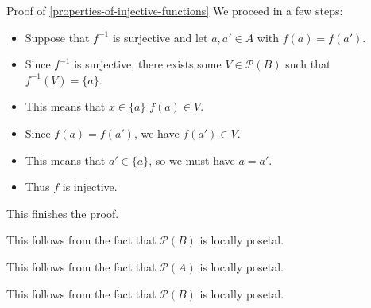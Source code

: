 \begin{Proof}{Proof of \cref{properties-of-injective-functions}}
    We proceed in a few steps:
    \begin{itemize}
        \item Suppose that $f^{-1}$ is surjective and let $a,a'\in A$ with $f(a)=f(a')$.
        \item Since $f^{-1}$ is surjective, there exists some $V\in\mathcal{P}(B)$ such that $f^{-1}(V)=\{a\}$.
        \item This means that $x\in\{a\}$ \textiff $f(a)\in V$.
        \item Since $f(a)=f(a')$, we have $f(a')\in V$.
        \item This means that $a'\in\{a\}$, so we must have $a=a'$.
        \item Thus $f$ is injective.
    \end{itemize}
    This finishes the proof.

    This follows from the fact that $\mathcal{P}(B)$ is locally posetal.

    This follows from the fact that $\mathcal{P}(A)$ is locally posetal.

    This follows from the fact that $\mathcal{P}(B)$ is locally posetal.


\end{Proof}
